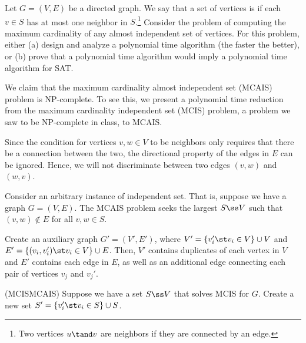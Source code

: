 \documentclass{article}
\begin{document}
\setcounter{section}{13}
\setcounter{exercise}{3}
\begin{exercise}
Let $ G=(V,E) $ be a directed graph.
We say that a set of vertices is  if each $ v\in S $ has at most one neighbor in $ S $.\footnote[5]{Two vertices $u \tand v$ are neighbors if they are connected by an edge.}
Consider the problem of computing the maximum cardinality of any almost independent set of vertices.
For this problem, either (a) design and analyze a polynomial time algorithm (the faster the better), or (b) prove that a polynomial time algorithm would imply a polynomial time algorithm for SAT.
\end{exercise}

\begin{solution}
  We claim that the maximum cardinality almost independent set (MCAIS) problem is NP-complete.
  To see this, we present a polynomial time reduction from the maximum cardinality independent set (MCIS) problem, a problem we saw to be NP-complete in class, to MCAIS.

  \begin{note}
    Since the condition for vertices $ v,w\in V $ to be neighbors only requires that there be a connection between the two, the directional property of the edges in $ E $ can be ignored.
    Hence, we will not discriminate between two edges $ (v,w) $ and $ (w,v) $.
  \end{note}

  Consider an arbitrary instance of independent set.
  That is, suppose we have a graph $ G=(V,E) $.
  The MCAIS problem seeks the largest $ S\ss V $ such that $ (v,w)\not\in E $ for all $ v,w\in S $.

  Create an auxiliary graph $ G'=(V',E') $, where $ V'=\{v_i'\st v_i\in V\}\cup V $ and $ E'=\{(v_i,v_i')\st v_i\in V\}\cup E $.
  Then, $ V' $ contains duplicates of each vertex in $ V $ and $ E' $ contains each edge in $ E $, as well as an additional edge connecting each pair of vertices $ v_j $ and $ v_j' $.

  \begin{subproof}[Correctness.]
    (MCIS\imp MCAIS)
    Suppose we have a set $ S\ss V $ that solves MCIS for $ G $.
    Create a new set $ S'=\{v_i'\st v_i\in S\}\cup S $.
  \end{subproof}
\end{solution}
\pagebreak
\end{document}
